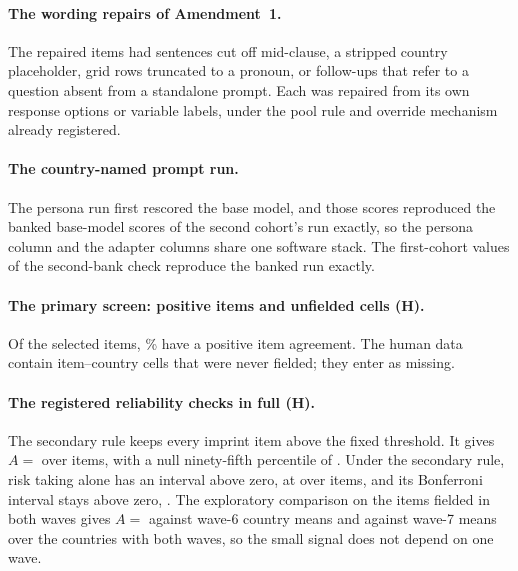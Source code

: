 \documentclass[12pt]{article}
\begin{document}
\paragraph{The wording repairs of Amendment~1.} The  repaired items had sentences cut off mid-clause, a stripped country placeholder, grid rows truncated to a pronoun, or follow-ups that refer to a question absent from a standalone prompt. Each was repaired from its own response options or variable labels, under the pool rule and override mechanism already registered.

\paragraph{The country-named prompt run.} The persona run first rescored the base model, and those scores reproduced the banked base-model scores of the second cohort's run exactly, so the persona column and the adapter columns share one software stack. The first-cohort values of the second-bank check reproduce the banked run exactly.

\paragraph{The primary screen: positive items and unfielded cells (H).} Of the selected items, \% have a positive item agreement. The human data contain  item--country cells that were never fielded; they enter as missing.

\paragraph{The registered reliability checks in full (H).} The secondary rule keeps every imprint item above the fixed threshold. It gives $A=$  over  items, with a null ninety-fifth percentile of . Under the secondary rule, risk taking alone has an interval above zero, at   over  items, and its Bonferroni interval stays above zero, . The exploratory comparison on the  items fielded in both waves gives $A=$  against wave-6 country means and  against wave-7 means over the  countries with both waves, so the small signal does not depend on one wave.
\end{document}
